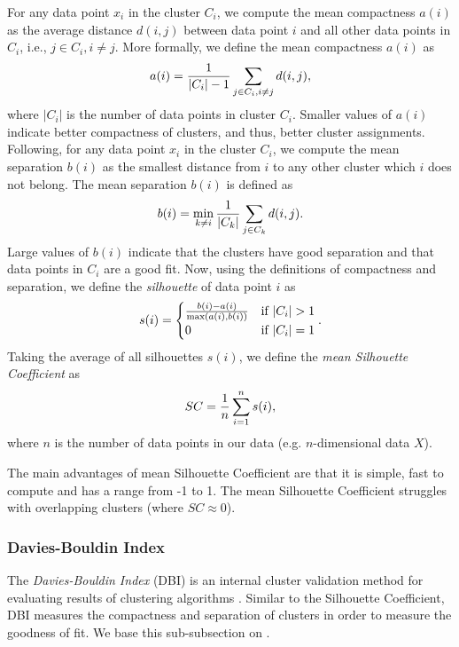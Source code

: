 For any data point $x_i$ in the cluster $C_i$, we compute the mean compactness $a(i)$ as the average distance $d(i, j)$ between data point $i$ and all other data points in $C_i$, i.e., $j \in C_i, i \neq j$. More formally, we define the mean compactness $a(i)$ as
\begin{align}
    a(i) = \frac{1}{|C_i| - 1} \sum\limits_{j \in C_i, i \neq j}^{}{d(i, j)},
    \label{eqn:silhouette-coef-a}
\end{align}
where $|C_i|$ is the number of data points in cluster $C_i$. Smaller values of $a(i)$ indicate better compactness of clusters, and thus, better cluster assignments. Following, for any data point $x_i$ in the cluster $C_i$, we compute the mean separation $b(i)$ as the smallest distance from $i$ to any other cluster which $i$ does not belong. The mean separation $b(i)$ is defined as
\begin{align}
    b(i) = \min_{k \neq i} \frac{1}{|C_k|} \sum\limits_{j \in C_k}^{}{d(i, j)}.
    \label{eqn:silhouette-coef-b}
\end{align}
Large values of $b(i)$ indicate that the clusters have good separation and that data points in $C_i$ are a good fit. Now, using the definitions of compactness and separation, we define the \textit{silhouette} of data point $i$ as
\begin{align}
    s(i) = \begin{cases}
        \frac{b(i) - a(i)}{\max \left(a(i), b(i)\right)} & \mbox{if } |C_i| > 1 \\
        0 & \mbox{if } |C_i| = 1
    \end{cases}.
\end{align}
Taking the average of all silhouettes $s(i)$, we define the \textit{mean Silhouette Coefficient} as
\begin{align}
    SC = \frac{1}{n} \sum\limits_{i=1}^{n}{s(i)},
    \label{eqn:silhouette-coef}
\end{align}
where $n$ is the number of data points in our data (e.g. $n$-dimensional data $X$).

The main advantages of mean Silhouette Coefficient are that it is simple, fast to compute and has a range from -1 to 1. The mean Silhouette Coefficient struggles with overlapping clusters (where $SC \approx 0$).

\subsubsection{Davies-Bouldin Index}
\label{sec:davies-bouldin-index}
The \textit{Davies-Bouldin Index} (DBI) is an internal cluster validation method for evaluating results of clustering algorithms \cite{DaviesBouldin1979}. Similar to the Silhouette Coefficient, DBI measures the compactness and separation of clusters in order to measure the goodness of fit. We base this sub-subsection on \cite{DaviesBouldin1979}.

